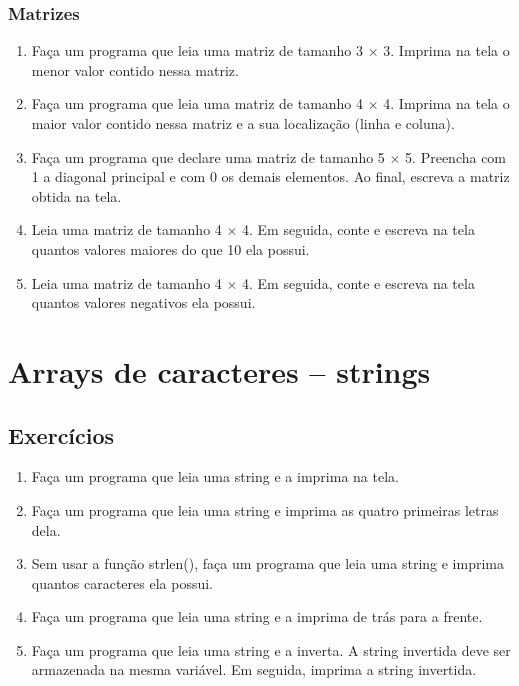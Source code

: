 \documentclass[a4paper,12pt]{article}
\begin{document}
\subsubsection{Matrizes}

\begin{enumerate}
  \item Faça um programa que leia uma matriz de tamanho 3 $\times$ 3. Imprima na tela o menor valor contido nessa matriz.
  \item Faça um programa que leia uma matriz de tamanho 4 $\times$ 4. Imprima na tela o maior valor contido nessa matriz e a sua localização (linha e coluna).
  \item Faça um programa que declare uma matriz de tamanho 5 $\times$ 5. Preencha com 1 a diagonal principal e com 0 os demais elementos. Ao final, escreva a matriz obtida na tela.
  \item Leia uma matriz de tamanho 4 $\times$ 4. Em seguida, conte e escreva na tela quantos valores maiores do que 10 ela possui.
  \item Leia uma matriz de tamanho 4 $\times$ 4. Em seguida, conte e escreva na tela quantos valores negativos ela possui.
\end{enumerate}

\pagebreak
\section{Arrays de caracteres – strings}

\setcounter{subsection}{3}
\subsection{Exercícios}

\begin{enumerate}
  \item Faça um programa que leia uma string e a imprima na tela.
  \item Faça um programa que leia uma string e imprima as quatro primeiras letras dela.
  \item Sem usar a função strlen(), faça um programa que leia uma string e imprima quantos caracteres ela possui.
  \item Faça um programa que leia uma string e a imprima de trás para a frente.
  \item Faça um programa que leia uma string e a inverta. A string invertida deve ser armazenada na mesma variável. Em seguida, imprima a string invertida.
\end{enumerate}
\end{document}
